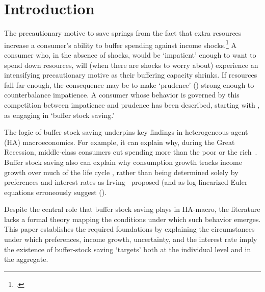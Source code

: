 \documentclass[BufferStockTheory]{subfiles}
\begin{document}
\hypersetup{pageanchor=true}  %

\pagebreak
\hypertarget{Introduction}{}
\section{Introduction}\label{sec:intro}
\setcounter{page}{0}

The precautionary motive to save springs from the fact that extra resources increase a consumer's ability to buffer spending against income shocks.\footnote{\cite{CarrollKimballPSPW}.}
A consumer who, in the absence of shocks, would be `impatient' enough to want to spend down resources, will (when there are shocks to worry about) experience an intensifying precautionary motive as their buffering capacity shrinks.
If resources fall far enough, the consequence may be to make `prudence' (\cite{kimball:standardra}) strong enough to counterbalance impatience.
A consumer whose behavior is governed by this competition between impatience and prudence has been described, starting with \cite{deatonLiqConstr}, as engaging in `buffer stock saving.'


The logic of buffer stock saving underpins key findings in heterogeneous-agent (HA) macroeconomics.
For example, it can explain why, during the Great Recession, middle-class consumers cut spending more than the poor or the rich~\citep{kmpHandbook}.
Buffer stock saving also can explain why consumption growth tracks income growth over much of the life cycle \citep{carrollBSLCPIH}, rather than being determined solely by preferences and interest rates as Irving~\cite{fisherInterestTheory} proposed (and as log-linearized Euler equations erroneously suggest (\cite{carroll:death}).


Despite the central role that buffer stock saving plays in HA-macro, the literature lacks a formal theory mapping the conditions under which such behavior emerges.
This paper establishes the required foundations by explaining the circumstances under which preferences, income growth, uncertainty, and the interest rate imply the existence of buffer-stock saving `targets' both at the individual level and in the aggregate.
\end{document}
